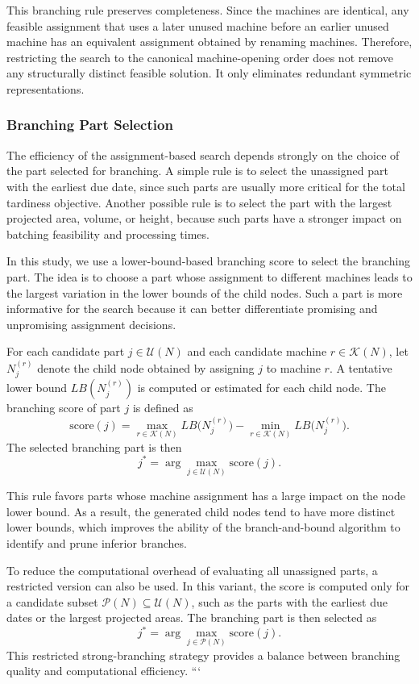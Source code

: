 \documentclass[letterpaper, 10 pt, conference]{ieeeconf}  %
\begin{document}
This branching rule preserves completeness. Since the machines are
identical, any feasible assignment that uses a later unused machine before
an earlier unused machine has an equivalent assignment obtained by
renaming machines. Therefore, restricting the search to the canonical
machine-opening order does not remove any structurally distinct feasible
solution. It only eliminates redundant symmetric representations.

\subsubsection{Branching Part Selection}

The efficiency of the assignment-based search depends strongly on the
choice of the part selected for branching. A simple rule is to select the
unassigned part with the earliest due date, since such parts are usually
more critical for the total tardiness objective. Another possible rule is
to select the part with the largest projected area, volume, or height,
because such parts have a stronger impact on batching feasibility and
processing times.

In this study, we use a lower-bound-based branching score to select the
branching part. The idea is to choose a part whose assignment to different
machines leads to the largest variation in the lower bounds of the child
nodes. Such a part is more informative for the search because it can better
differentiate promising and unpromising assignment decisions.

For each candidate part $j\in\mathcal{U}(N)$ and each candidate machine
$r\in\mathcal{K}(N)$, let $N_j^{(r)}$ denote the child node obtained by
assigning $j$ to machine $r$. A tentative lower bound $LB(N_j^{(r)})$ is
computed or estimated for each child node. The branching score of part $j$
is defined as
\[
\mathrm{score}(j)
=
\max_{r\in\mathcal{K}(N)} LB\bigl(N_j^{(r)}\bigr)
-
\min_{r\in\mathcal{K}(N)} LB\bigl(N_j^{(r)}\bigr).
\]
The selected branching part is then
\[
j^*=\arg\max_{j\in\mathcal{U}(N)} \mathrm{score}(j).
\]

This rule favors parts whose machine assignment has a large impact on the
node lower bound. As a result, the generated child nodes tend to have more
distinct lower bounds, which improves the ability of the branch-and-bound
algorithm to identify and prune inferior branches.

To reduce the computational overhead of evaluating all unassigned parts, a
restricted version can also be used. In this variant, the score is computed
only for a candidate subset $\mathcal{P}(N)\subseteq\mathcal{U}(N)$, such as
the parts with the earliest due dates or the largest projected areas. The
branching part is then selected as
\[
j^*=\arg\max_{j\in\mathcal{P}(N)} \mathrm{score}(j).
\]
This restricted strong-branching strategy provides a balance between
branching quality and computational efficiency.
```
\end{document}
